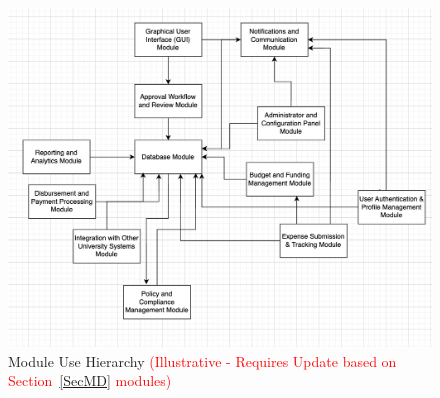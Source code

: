 \documentclass[12pt, titlepage]{article}
\begin{document}
\begin{figure}[H]
  \centering
  \includegraphics[width=1\textwidth]{img/diagram.png} %
  \caption{Module Use Hierarchy \textcolor{red}{(Illustrative - Requires Update based on Section~\ref{SecMD} modules)}} %
  \label{fig:diagram} %
  \label{FigUH} %
\end{figure}
\end{document}
